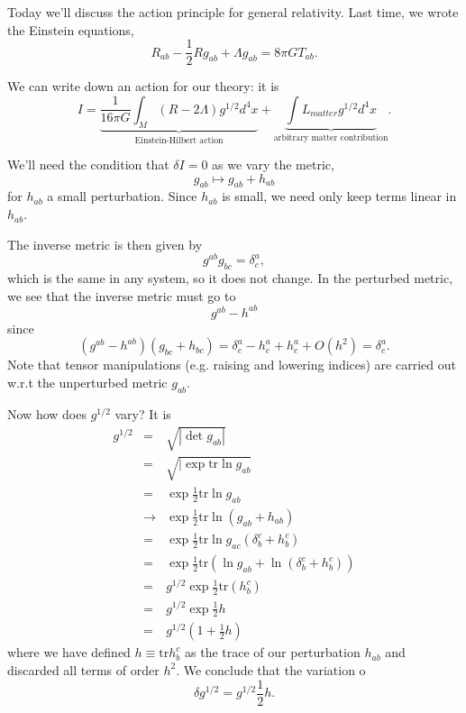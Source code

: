 Today we'll discuss the action principle for general relativity. Last time, we wrote the Einstein equations,
$$R_{ab}-\frac{1}{2}Rg_{ab}+\Lambda g_{ab}=8\pi GT_{ab}.$$

We can write down an action for our theory: it is
$$I=\underbrace{\frac{1}{16\pi G}\int_M (R-2\Lambda)g^{1/2}d^4x}_{\text{Einstein-Hilbert action}} + \underbrace{\int L_{matter} g^{1/2}d^4x}_{\text{arbitrary matter contribution}}.$$

We'll need the condition that $\delta I=0$ as we vary the metric,
$$g_{ab}\mapsto g_{ab}+h_{ab}$$ for $h_{ab}$ a small perturbation. Since $h_{ab}$ is small, we need only keep terms linear in $h_{ab}$. 

The inverse metric is then given by
$$g^{ab} g_{bc}=\delta^a_c,$$ which is the same in any system, so it does not change. In the perturbed metric, we see that the inverse metric must go to 
$$g^{ab}-h^{ab}$$ since
$$(g^{ab}-h^{ab})(g_{bc}+h_{bc})=\delta^a_c -h^a_c+h^a_c+O(h^2)=\delta^a_c.$$
Note that tensor manipulations (e.g. raising and lowering indices) are carried out w.r.t the unperturbed metric $g_{ab}$.

Now how does $g^{1/2}$ vary? It is
\begin{eqnarray*}
g^{1/2}&=& \sqrt{|\det g_{ab}|}\\
&=&\sqrt{|\exp \text{tr}\ln g_{ab}}\\
&=&\exp \frac{1}{2} \text{tr}\ln g_{ab}\\
&\to& \exp \frac{1}{2}\text{tr}\ln (g_{ab}+h_{ab})\\
&=&\exp \frac{1}{2} \text{tr} \ln g_{ac} (\delta^c_b + h^c_b)\\
&=&\exp \frac{1}{2}\text{tr}(\ln g_{ab}+\ln (\delta^c_b +h^c_b))\\
&=& g^{1/2} \exp \frac{1}{2} \text{tr}(h^c_b)\\
&=&g^{1/2} \exp \frac{1}{2} h\\
&=&g^{1/2} \left(1+\frac{1}{2}h\right)
\end{eqnarray*}
where we have defined $h\equiv \text{tr} h^c_b$ as the trace of our perturbation $h_{ab}$ and discarded all terms of order $h^2$. We conclude that the variation o
$$\delta g^{1/2}=g^{1/2}\frac{1}{2}h.$$

